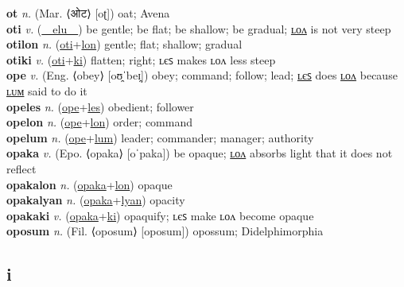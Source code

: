 \textbf{ot} \textit{n.} (Mar. ⟨ओट⟩ [oʈ])
oat; Avena \label{ot} \\
\textbf{oti} \textit{v.} (\hyperref[elu]{~~elu~~})
be gentle; be flat; be shallow; be gradual; \hyperref[otilon]{ʟᴏᴧ} is not very steep \label{oti} \\
\textbf{otilon} \textit{n.} (\hyperref[oti]{oti}+\hyperref[lon]{lon})
gentle; flat; shallow; gradual \label{otilon} \\
\textbf{otiki} \textit{v.} (\hyperref[oti]{oti}+\hyperref[ki]{ki})
flatten; right; ʟєꜱ makes ʟᴏᴧ less steep \label{otiki} \\
\textbf{ope} \textit{v.} (Eng. ⟨obey⟩ [oʊ̯ˈbeɪ̯])
obey; command; follow; lead; \hyperref[opeles]{ʟєꜱ} does \hyperref[opelon]{ʟᴏᴧ} because \hyperref[opelum]{ʟᴜᴍ} said to do it \label{ope} \\
\textbf{opeles} \textit{n.} (\hyperref[ope]{ope}+\hyperref[les]{les})
obedient; follower \label{opeles} \\
\textbf{opelon} \textit{n.} (\hyperref[ope]{ope}+\hyperref[lon]{lon})
order; command \label{opelon} \\
\textbf{opelum} \textit{n.} (\hyperref[ope]{ope}+\hyperref[lum]{lum})
leader; commander; manager; authority \label{opelum} \\
\textbf{opaka} \textit{v.} (Epo. ⟨opaka⟩ [oˈpaka])
be opaque; \hyperref[opakalon]{ʟᴏᴧ} absorbs light that it does not reflect \label{opaka} \\
\textbf{opakalon} \textit{n.} (\hyperref[opaka]{opaka}+\hyperref[lon]{lon})
opaque \label{opakalon} \\
\textbf{opakalyan} \textit{n.} (\hyperref[opaka]{opaka}+\hyperref[lyan]{lyan})
opacity \label{opakalyan} \\
\textbf{opakaki} \textit{v.} (\hyperref[opaka]{opaka}+\hyperref[ki]{ki})
opaquify; ʟєꜱ make ʟᴏᴧ become opaque \label{opakaki} \\
\textbf{oposum} \textit{n.} (Fil. ⟨oposum⟩ [oposum])
opossum; Didelphimorphia \label{oposum} \\
\subsection{i}

